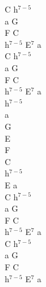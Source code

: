 \documentclass[a5paper, 10pt]{book}
\begin{document}
\begin{minipage}[t]{0.2\textwidth}
  C h$^{7-5}$\\
  a G\\
  F C\\
  h$^{7-5}$ E$^7$ a\\
  C h$^{7-5}$\\
  a G\\
  F C\\
  h$^{7-5}$ E$^7$ a\\

  h$^{7-5}$\\
  a\\
  G\\
  E\\
  F\\
  C\\
  h$^{7-5}$\\
  E a\\

  C h$^{7-5}$\\
  a G\\
  F C\\
  h$^{7-5}$ E$^7$ a\\
  C h$^{7-5}$\\
  a G\\
  F C\\
  h$^{7-5}$ E$^7$ a\\

\end{minipage}


\newpage
\end{document}
